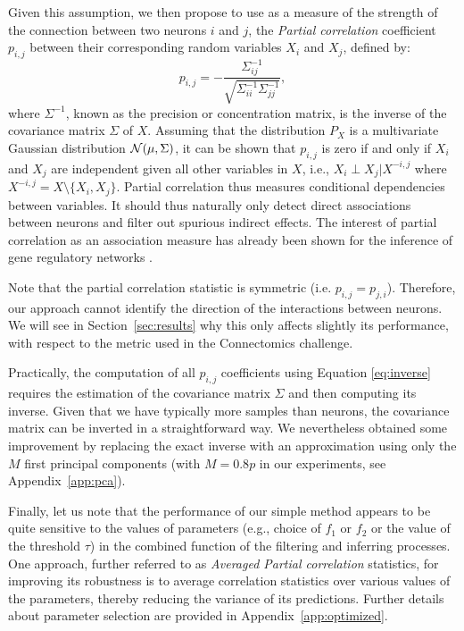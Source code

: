 \documentclass[wcp]{jmlr}
\begin{document}

Given this assumption, we then propose to use as a measure of the
strength of the connection between two neurons $i$ and $j$, the
\textit{Partial correlation} coefficient $p_{i,j}$ between their corresponding
random variables $X_i$ and $X_j$, defined by:
\begin{equation}
p_{i,j} =
-\frac{\Sigma^{-1}_{ij}}{\sqrt{\Sigma^{-1}_{ii} \Sigma^{-1}_{jj}}}, \label{eq:inverse}
\end{equation}
where $\Sigma^{-1}$, known as the precision or concentration matrix, is the inverse of the covariance matrix $\Sigma$ of $X$. 
Assuming that the distribution $P_X$ is a multivariate Gaussian
distribution ${\cal N}(\mu,\Sigma)$, it can be shown that $p_{i,j}$ is
zero if and only if $X_i$ and $X_j$ are independent given all other
variables in $X$, i.e., $X_i \perp X_j|X^{-i,j}$ where $X^{-i,j}= X
\setminus\{X_i,X_j\}$. Partial correlation thus measures conditional
dependencies between variables. It should thus naturally only detect direct associations
between neurons and filter out spurious indirect effects. The interest
of partial correlation as an association measure has already been
shown for the inference of gene regulatory networks
\citep{de2004discovery,Schafer:2005}.

Note that the partial correlation statistic is symmetric
(i.e. $p_{i,j}=p_{j,i}$). Therefore, our approach cannot identify the
direction of the interactions between neurons. We will see in
Section~\ref{sec:results} why this only affects slightly its
performance, with respect to the metric used in the Connectomics
challenge.

Practically, the computation of all $p_{i,j}$ coefficients using Equation
\ref{eq:inverse} requires the estimation of the covariance matrix $\Sigma$
and then computing its inverse. Given that we have typically more
samples than neurons, the covariance matrix can be inverted in a
straightforward way. We nevertheless obtained some improvement by
replacing the exact inverse with an approximation using only the $M$
first principal components \citep{bishop2006pattern} (with
$M=0.8 p$ in our experiments, see Appendix~\ref{app:pca}).

Finally, let us note that the performance of our simple method appears to
be quite sensitive to the values of parameters (e.g., choice of $f_1$ or $f_2$
or the value of the threshold $\tau$) in the combined function of the
filtering and inferring processes. One approach, further referred
to as \textit{Averaged Partial correlation} statistics, for improving
its robustness is to average correlation statistics over various
values of the parameters, thereby reducing the variance of its
predictions. Further details about parameter selection are provided in
Appendix~\ref{app:optimized}.
\end{document}
